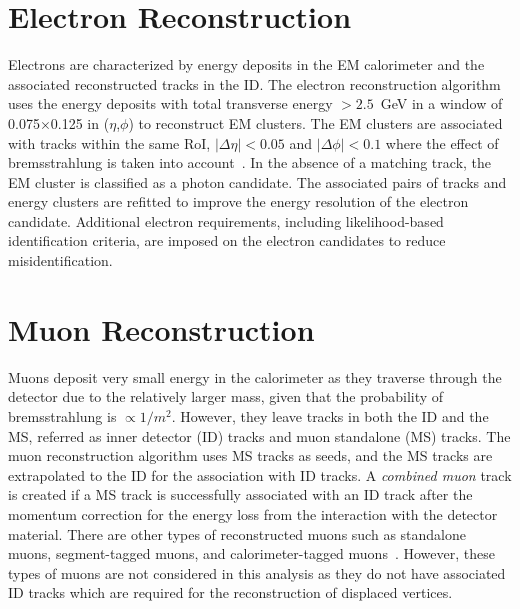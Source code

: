 \section{Electron Reconstruction}
\label{sec:reco:lep}

Electrons are characterized by energy deposits in the EM calorimeter and the associated reconstructed tracks in the ID. The electron reconstruction algorithm uses the energy deposits with total transverse energy $>2.5$~\si{\GeV} in a window of 0.075$\times$0.125 in ($\eta$,$\phi$) to reconstruct EM clusters. The EM clusters are associated with tracks within the same RoI, $|\Delta\eta|<0.05$ and $|\Delta\phi|<0.1$ where the effect of bremsstrahlung is taken into account~\cite{Aad:2014fxa}. In the absence of a matching track, the EM cluster is classified as a photon candidate. The associated pairs of tracks and energy clusters are refitted to improve the energy resolution of the electron candidate. Additional electron requirements, including likelihood-based identification criteria, are imposed on the electron candidates to reduce misidentification.


\section{Muon Reconstruction}
\label{sec:reco:muon}

Muons deposit very small energy in the calorimeter as they traverse through the detector due to the relatively larger mass, given that the probability of bremsstrahlung is $\propto 1/m^{2}$. However, they leave tracks in both the ID and the MS, referred as inner detector (ID) tracks and muon standalone (MS) tracks. The muon reconstruction algorithm uses MS tracks as seeds, and the MS tracks are extrapolated to the ID for the association with ID tracks. A \textit{combined muon} track is created if a MS track is successfully associated with an ID track after the momentum correction for the energy loss from the interaction with the detector material. There are other types of reconstructed muons such as standalone muons, segment-tagged muons, and calorimeter-tagged muons~\cite{Aad:2016jkr}. However, these types of muons are not considered in this analysis as they do not have associated ID tracks which are required for the reconstruction of displaced vertices.

